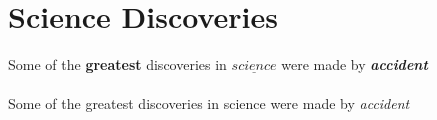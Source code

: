 \documentclass{article}
\begin{document}
		
	\section{Science Discoveries}
	Some of the \textbf{greatest}
	discoveries in $\underline{science}$
	were made by
	\textbf{\textit{accident}}
	
	\paragraph{}
	Some of the greatest discoveries in science were made by \emph{accident}
	
\end{document}

